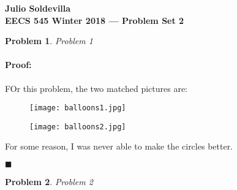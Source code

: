 \documentclass[12pt]{article}
\newenvironment{proof}{\paragraph{Proof: }}{\hfill$\blacksquare$}
\newtheorem{problem}{Problem}%
\begin{document}
\begin{center}
{\bf Julio Soldevilla}
\\
{\bf EECS 545 Winter 2018 --- Problem Set 2 }
\end{center}

\begin{problem}
\normalfont
Problem 1
\end{problem}

\begin{proof}
FOr this problem, the two matched pictures are:

\begin{figure}[!htbp]
\centering
\texttt{[image: balloons1.jpg]}
\caption{}
\end{figure}

\begin{figure}[!htbp]
\centering
\texttt{[image: balloons2.jpg]}
\caption{}
\end{figure}

For some reason, I was never able to make the circles better.

\end{proof}

\begin{problem}
\normalfont
Problem 2
\end{problem}
\end{document}
